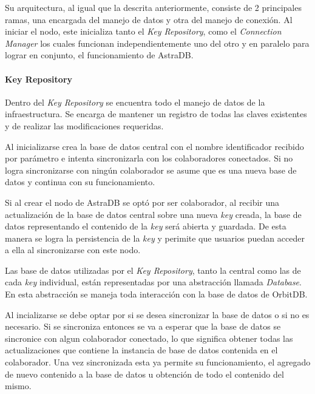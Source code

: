 Su arquitectura, al igual que la descrita anteriormente, consiste de 2 principales ramas, una encargada del manejo de datos y otra del manejo de conexión. Al iniciar el nodo, este inicializa tanto el \textit{Key Repository}, como el \textit{Connection Manager} los cuales funcionan independientemente uno del otro y en paralelo para lograr en conjunto, el funcionamiento de AstraDB.

\paragraph{Key Repository}

Dentro del \textit{Key Repository} se encuentra todo el manejo de datos de la infraestructura. Se encarga de mantener un registro de todas las claves existentes y de realizar las modificaciones requeridas.

Al inicializarse crea la base de datos central con el nombre identificador recibido por parámetro e intenta sincronizarla con los colaboradores conectados. Si no logra sincronizarse con ningún colaborador se asume que es una nueva base de datos y continua con su funcionamiento.

Si al crear el nodo de AstraDB se optó por ser colaborador, al recibir una actualización de la base de datos central sobre una nueva \textit{key} creada, la base de datos representando el contenido de la \textit{key} será abierta y guardada. De esta manera se logra la persistencia de la \textit{key} y  perimite que usuarios puedan acceder a ella al sincronizarse con este nodo.

Las base de datos utilizadas por el \textit{Key Repository}, tanto la central como las de cada \textit{key} individual, están representadas por una abstracción llamada \textit{Database}. En esta abstracción se maneja toda interacción con la base de datos de OrbitDB.

Al incializarse se debe optar por si se desea sincronizar la base de datos o si no es necesario. Si se sincroniza entonces se va a esperar que la base de datos se sincronice con algun colaborador conectado, lo que significa obtener todas las actualizaciones que contiene la instancia de base de datos contenida en el colaborador. Una vez sincronizada esta ya permite su funcionamiento, el agregado de nuevo contenido a la base de datos u obtención de todo el contenido del mismo.

